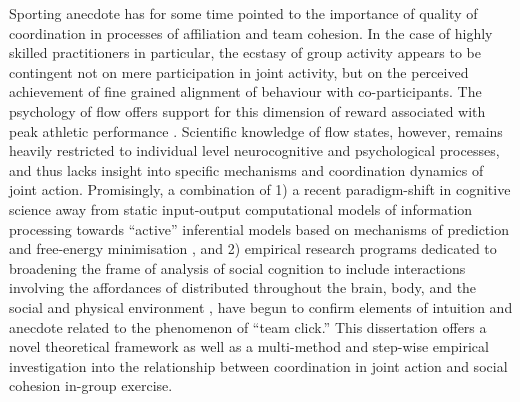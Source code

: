 \begin{CJK}{UTF8}{gbsn}
Sporting anecdote has for some time pointed to the importance of quality of coordination in processes of affiliation and team cohesion.  In the case of highly skilled practitioners in particular, the ecstasy of group activity appears to be contingent not on mere participation in joint activity, but on the perceived achievement of fine grained alignment of behaviour with co-participants.  The psychology of flow offers support for this dimension of reward associated with peak athletic performance \citep{Jackson1995}. Scientific knowledge of flow states, however, remains heavily restricted to individual level neurocognitive and psychological processes, and thus lacks insight into specific mechanisms and coordination dynamics of joint action.  Promisingly, a combination of 1) a recent paradigm-shift in cognitive science away from static input-output computational models of information processing towards ``active'' inferential models based on mechanisms of prediction and free-energy minimisation \citep{Friston2010,Clark2013}, and 2) empirical research programs dedicated to broadening the frame of analysis of social cognition to include interactions involving the affordances of distributed throughout the brain, body, and the social and physical environment \citep{Sebanz2006,Semin2008}, have begun to confirm elements of intuition and anecdote related to the phenomenon of ``team click.''  This dissertation offers a novel theoretical framework as well as a multi-method and step-wise empirical investigation into the relationship between coordination in joint action and social cohesion in-group exercise.



\end{CJK}

